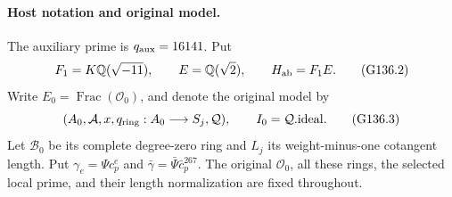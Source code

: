 \paragraph{Host notation and original model.}
The auxiliary prime is \(q_{\rm aux}=16141\).  Put
\[
 F_1=K\mathbb Q(\sqrt{-11}),\qquad
 E=\mathbb Q(\sqrt2),\qquad
 H_{\rm ab}=F_1E.
 \tag{G136.2}
\]
Write \(E_0=\operatorname{Frac}(\mathcal O_0)\), and denote the
original model by
\[
 (A_0,\mathcal A,x,q_{\rm ring}:A_0\longrightarrow S_j,\mathcal Q),
 \qquad I_0=\mathcal Q.\mathrm{ideal}.
 \tag{G136.3}
\]
Let \(\mathscr B_0\) be its complete degree-zero ring and \(L_j\)
its weight-minus-one cotangent length.  Put
\(\gamma_e=\Psi c_p^e\) and
\(\bar\gamma=\bar\Psi\bar c_p^{267}\).
The original \(\mathcal O_0\), all these rings, the selected
local prime, and their length normalization are fixed throughout.

